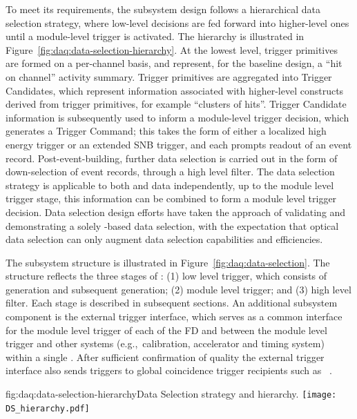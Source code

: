 To meet its requirements, the  subsystem design follows a
hierarchical data selection strategy, where low-level decisions are fed forward
into higher-level ones until a module-level trigger is activated. 
The hierarchy is illustrated in Figure~\ref{fig:daq:data-selection-hierarchy}. 
At the lowest level, trigger primitives are formed on a per-channel basis, and
represent, for the baseline design, a ``hit on channel'' activity summary.
Trigger primitives are aggregated into Trigger Candidates, which represent
information associated with higher-level constructs derived from trigger
primitives, for example ``clusters of hits''.
Trigger Candidate information is subsequently used to inform a module-level
trigger decision, which generates a Trigger Command; this takes the form of
either a localized high energy trigger or an extended SNB trigger, and each
prompts readout of an event record.
Post-event-building, further data selection is carried out in the form of
down-selection of event records, through a high level filter.
The data selection strategy is applicable to both  and 
data independently, up to the module level trigger stage, this information can
be combined to form a module level trigger decision.
Data selection design efforts have taken the approach of validating and
demonstrating a solely -based data selection, with the expectation that
optical data selection can only augment data selection capabilities and efficiencies.

The subsystem structure is illustrated in Figure~\ref{fig:daq:data-selection}.
The structure reflects the three stages of : (1) low level
trigger, which consists of  generation and subsequent
 generation; (2) module level trigger; and (3) high level
filter.
Each stage is described in subsequent sections.
An additional subsystem component is the external trigger interface, which
serves as a common interface for the module level trigger of each of the FD
 and between the module level trigger and other systems
(e.g.,~calibration, accelerator and timing system) within a single
.
After sufficient confirmation of quality the external trigger interface also
sends  triggers to global coincidence trigger recipients such as
~\cite{snews}.

\begin{dunefigure}{fig:daq:data-selection-hierarchy}{Data Selection
    strategy and hierarchy.}
  \texttt{[image: DS\_hierarchy.pdf]}
\end{dunefigure}

